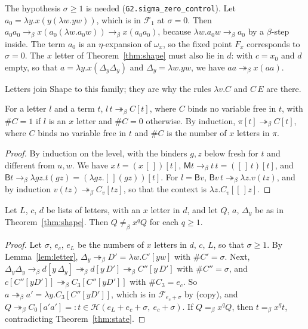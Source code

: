 \documentclass[a4paper,english]{lipics-v2021}
\newcommand{\B}{\mathsf{B}}
\newcommand{\M}{\mathsf{M}}
\newcommand{\bred}{\to_{\beta}}
\newcommand{\breds}{\twoheadrightarrow_{\beta}}
\newcommand{\eqb}{=_{\beta}}
\newcommand{\neqb}{\neq_{\beta}}
\newcommand{\Del}[1]{\Delta_{#1}}
\newcommand{\cnt}[1]{\##1}
\newcommand{\Fam}{\mathcal{F}}
\newcommand{\Hst}{\mathcal{H}}
\newcommand{\om}{\omega_x}
\newcommand{\lean}[1]{\texttt{#1}}
\begin{document}
The hypothesis $\sigma \geq 1$ is needed (\lean{G2.sigma\_zero\_control}). Let $a_0 = \lambda y.x(y(\lambda w.yw))$, which is in $\Fam_1$ at $\sigma = 0$. Then $a_0a_0 \bred x(a_0(\lambda w.a_0w)) \bred x(a_0a_0)$, because $\lambda w.a_0w \bred a_0$ by a $\beta$-step inside. The term $a_0$ is an $\eta$-expansion of $\om$, so the fixed point $F_x$ corresponds to $\sigma = 0$. The $x$ letter of Theorem~\ref{thm:shape} must also lie in $d$: with $c = x_0$ and $d$ empty, so that $a = \lambda y.x(\Del{y}\Del{y})$ and $\Del{y} = \lambda w.yw$, we have $aa \breds x(aa)$.

Letters join Shape to this family; they are why the rules $\lambda v.C$ and $C\,E$ are there.

\begin{lemma}\label{lem:letter}
For a letter $l$ and a term $t$, $l\,t \breds C[t]$, where $C$ binds no variable free in $t$, with $\cnt{C} = 1$ if $l$ is an $x$ letter and $\cnt{C} = 0$ otherwise. By induction, $\pi[t] \breds C[t]$, where $C$ binds no variable free in $t$ and $\cnt{C}$ is the number of $x$ letters in $\pi$.
\end{lemma}

\begin{proof}
By induction on the level, with the binders $g,z$ below fresh for $t$ and different from $u,w$. We have $x\,t = (x\,[\,])[t]$, $\M t \bred t\,t = ([\,]\,t)[t]$, and $\B t \bred \lambda gz.t(gz) = (\lambda gz.[\,](gz))[t]$. For $l = \B v$, $\B v\,t \breds \lambda z.v(tz)$, and by induction $v(tz) \breds C_v[tz]$, so that the context is $\lambda z.C_v[[\,]z]$.
\end{proof}

\begin{theorem}[Separation]\label{thm:core}
Let $L$, $c$, $d$ be lists of letters, with an $x$ letter in $d$, and let $Q$, $a$, $\Del{y}$ be as in Theorem~\ref{thm:shape}. Then $Q \neqb x^qQ$ for each $q \geq 1$.
\end{theorem}

\begin{proof}
Let $\sigma$, $e_c$, $e_L$ be the numbers of $x$ letters in $d$, $c$, $L$, so that $\sigma \geq 1$. By Lemma~\ref{lem:letter}, $\Del{y} \breds D' = \lambda w.C'[yw]$ with $\cnt{C'} = \sigma$. Next, $\Del{y}\Del{y} \bred d[y\,\Del{y}] \breds d[y\,D'] \breds C''[y\,D']$ with $\cnt{C''} = \sigma$, and $c[C''[yD']] \breds C_3[C''[yD']]$ with $\cnt{C_3} = e_c$. So $a \breds a' = \lambda y.C_3[C''[yD']]$, which is in $\Fam_{e_c+\sigma}$ by (copy), and $Q \breds C_0[a'a'] =: t \in \Hst(e_L+e_c+\sigma,\ e_c+\sigma)$. If $Q \eqb x^qQ$, then $t \eqb x^qt$, contradicting Theorem~\ref{thm:state}.
\end{proof}
\end{document}
